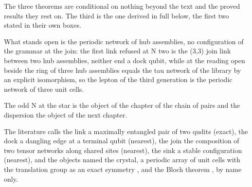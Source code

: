 The three theorems are conditional on nothing beyond the text and the proved results they rest on. The third is the one derived in full below, the first two stated in their own boxes.
\begin{chwall}\label{box:XII-1-lattice-as-the-periodic-sink:4}
What stands open is the periodic network of hub assemblies, no configuration of the grammar at the join: the first link refused at N two is the (3,3) join link between two hub assemblies, neither end a dock qubit, while at the reading open beside the ring of three hub assemblies equals the tau network of the library by an explicit isomorphism, so the lepton of the third generation is the periodic network of three unit cells.
\end{chwall}
The odd N at the star is the object of the chapter of the chain of pairs and the dispersion the object of the next chapter.
\begin{chbridge}
The literature calls the link a maximally entangled pair of two qudits (exact), the dock a dangling edge at a terminal qubit (nearest), the join the composition of two tensor networks along shared sites (nearest), the sink a stable configuration (nearest), and the objects named the crystal, a periodic array of unit cells with the translation group as an exact symmetry \cite{AshcroftMermin1976,Kittel2005}, and the Bloch theorem \cite{Bloch1929}, by name only.
\end{chbridge}
